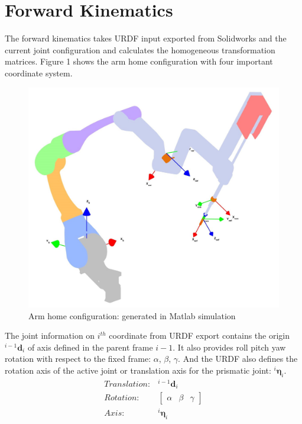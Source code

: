 \documentclass{article}
\begin{document}
\section{Forward Kinematics}
The forward kinematics takes URDF input exported from Solidworks and the current joint configuration and calculates the homogeneous transformation matrices. Figure 1 shows the arm home configuration with four important coordinate system.
\begin{figure}[htbp]
  \centering
    \includegraphics[width=1\columnwidth]{arm_home_config}
	\caption{Arm home configuration: generated in Matlab simulation}
\end{figure}
The joint information on $i^{th}$ coordinate from URDF export contains the origin $^{i-1}\mathbf{d}_i$ of axis defined in the parent frame $i-1$. It also provides roll pitch yaw rotation with respect to the fixed frame: $\alpha$, $\beta$, $\gamma$. And the URDF also defines the rotation axis of the active joint or translation axis for the prismatic joint: $^{i}\boldsymbol{\eta}_i$.
\begin{equation}
\begin{split}
Translation:&^{i-1}\mathbf{d}_i\\
Rotation:&\begin{bmatrix}
\alpha & \beta & \gamma
\end{bmatrix}\\
Axis:& ^{i}\boldsymbol{\eta}_i
\end{split}
\end{equation}
\end{document}
